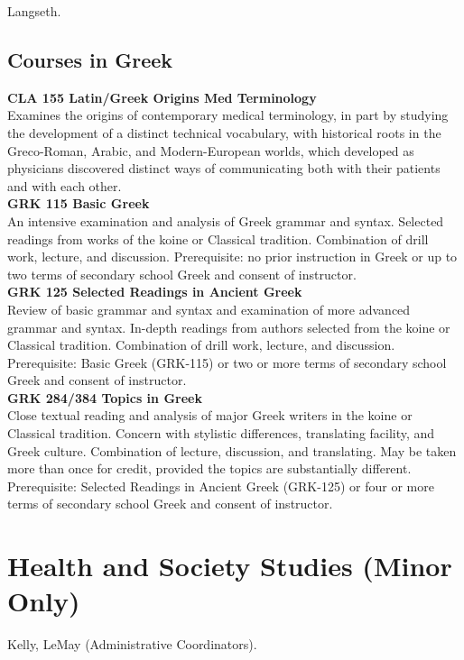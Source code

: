 \documentclass[
  letterpaper,
]{scrbook}
\begin{document}
Langseth.

\subsection{Courses in Greek}\label{courses-in-greek}

\textbf{CLA 155 Latin/Greek Origins Med Terminology}\\
Examines the origins of contemporary medical terminology, in part by
studying the development of a distinct technical vocabulary, with
historical roots in the Greco-Roman, Arabic, and Modern-European worlds,
which developed as physicians discovered distinct ways of communicating
both with their patients and with each other.\\
\textbf{GRK 115 Basic Greek}\\
An intensive examination and analysis of Greek grammar and syntax.
Selected readings from works of the koine or Classical tradition.
Combination of drill work, lecture, and discussion. Prerequisite: no
prior instruction in Greek or up to two terms of secondary school Greek
and consent of instructor.\\
\textbf{GRK 125 Selected Readings in Ancient Greek}\\
Review of basic grammar and syntax and examination of more advanced
grammar and syntax. In-depth readings from authors selected from the
koine or Classical tradition. Combination of drill work, lecture, and
discussion. Prerequisite: Basic Greek (GRK-115) or two or more terms of
secondary school Greek and consent of instructor.\\
\textbf{GRK 284/384 Topics in Greek}\\
Close textual reading and analysis of major Greek writers in the koine
or Classical tradition. Concern with stylistic differences, translating
facility, and Greek culture. Combination of lecture, discussion, and
translating. May be taken more than once for credit, provided the topics
are substantially different. Prerequisite: Selected Readings in Ancient
Greek (GRK-125) or four or more terms of secondary school Greek and
consent of instructor.

\section{Health and Society Studies (Minor
Only)}\label{sec-health-and-society-studies}

Kelly, LeMay (Administrative Coordinators).
\end{document}
